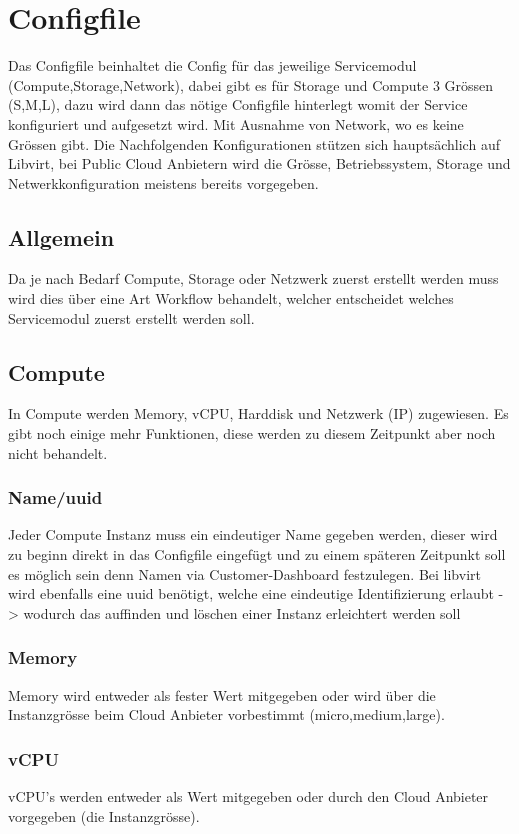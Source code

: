 
\section{Configfile}
Das Configfile beinhaltet die Config für das jeweilige Servicemodul 
(Compute,Storage,Network), dabei gibt es für Storage und Compute 3 Grössen 
(S,M,L), dazu wird dann das nötige Configfile hinterlegt womit der Service 
konfiguriert und aufgesetzt wird.
Mit Ausnahme von Network, wo es keine Grössen gibt.
Die Nachfolgenden Konfigurationen stützen sich hauptsächlich auf Libvirt, bei 
Public Cloud Anbietern wird die Grösse, Betriebssystem, Storage und Netwerkkonfiguration 
meistens bereits vorgegeben.

\subsection{Allgemein}
Da je nach Bedarf Compute, Storage oder Netzwerk zuerst erstellt werden muss 
wird dies über eine Art Workflow behandelt, welcher entscheidet welches
Servicemodul zuerst erstellt werden soll.

\subsection{Compute}
In Compute werden Memory, vCPU, Harddisk und Netzwerk (IP) zugewiesen.
Es gibt noch einige mehr Funktionen, diese werden zu diesem Zeitpunkt aber noch 
nicht behandelt.

\subsubsection{Name/uuid}
Jeder Compute Instanz muss ein eindeutiger Name gegeben werden, dieser wird zu 
beginn direkt in das Configfile eingefügt und zu einem späteren Zeitpunkt soll 
es möglich sein denn Namen via Customer-Dashboard festzulegen.
Bei libvirt wird ebenfalls eine uuid benötigt, welche eine eindeutige 
Identifizierung erlaubt -> wodurch das auffinden und löschen einer Instanz 
erleichtert werden soll

\subsubsection{Memory}
Memory wird entweder als fester Wert mitgegeben oder wird über die Instanzgrösse 
beim Cloud Anbieter vorbestimmt (micro,medium,large).

\subsubsection{vCPU}
vCPU's werden entweder als Wert mitgegeben oder durch den Cloud Anbieter vorgegeben (die Instanzgrösse). 

